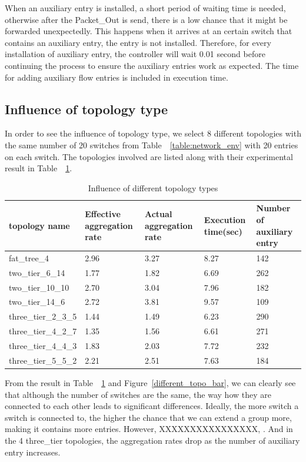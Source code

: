 When an auxiliary entry is installed, a short period of waiting time is needed, otherwise after the Packet\_Out is send, there is a low chance that it might be forwarded unexpectedly. This happens when it arrives at an certain switch that contains an auxiliary entry, the entry is not installed. Therefore, for every installation of auxiliary entry, the controller will wait 0.01 second before continuing the process to ensure the auxiliary entries work as expected. The time for adding auxiliary flow entries is included in execution time.

\subsection{Influence of topology type}
In order to see the influence of topology type, we select 8 different topologies with the same number of 20 switches from Table~~\ref{table:network_env} with 20 entries on each switch. The topologies involved are listed along with their experimental result in Table~~\ref{table:different_topo_type}. 

\begin{table}
\centering
\caption{Influence of different topology types}
\begin{tabular}{|l||l|l|l|l|}
\hline topology name & Effective aggregation rate & Actual aggregation rate & Execution time(sec) & Number of auxiliary entry \\
\hline
\hline fat\_tree\_4 & 2.96 & 3.27 & 8.27 & 142 \\
\hline two\_tier\_6\_14 & 1.77 & 1.82 & 6.69 & 262 \\ 
\hline two\_tier\_10\_10 & 2.70 & 3.04 & 7.96 & 182 \\
\hline two\_tier\_14\_6 & 2.72 & 3.81 & 9.57 & 109 \\ 
\hline three\_tier\_2\_3\_5 & 1.44 & 1.49 & 6.23 & 290 \\
\hline three\_tier\_4\_2\_7 & 1.35 & 1.56 & 6.61 & 271 \\
\hline three\_tier\_4\_4\_3 & 1.83 & 2.03 & 7.72 & 232 \\
\hline three\_tier\_5\_5\_2 & 2.21 & 2.51 & 7.63 & 184 \\
\hline
\end{tabular}
\label{table:different_topo_type}
\end{table}


From the result in Table~~\ref{table:different_topo_type} and Figure~\ref{different_topo_bar}, we can clearly see that although the number of switches are the same, the way how they are connected to each other leads to significant differences. 
Ideally, the more switch a switch is connected to, the higher the chance that we can extend a group more, making it contains more entries. However, XXXXXXXXXXXXXXXX, .
And in the 4 three\_tier topologies, the aggregation rates drop as the number of auxiliary entry increases.

